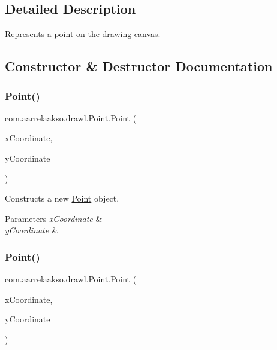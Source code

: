 \subsection{Detailed Description}
Represents a point on the drawing canvas. 

\subsection{Constructor \& Destructor Documentation}
\mbox{\label{classcom_1_1aarrelaakso_1_1drawl_1_1_point_a1eb402d4971df738ea66227c7c12cb70}} 
\subsubsection{\texorpdfstring{Point()}{Point()}\hspace{0.1cm}{\footnotesize\ttfamily [1/3]}}
{\footnotesize\ttfamily com.\+aarrelaakso.\+drawl.\+Point.\+Point (\begin{DoxyParamCaption}\item[{final \hyperlink{interfacecom_1_1aarrelaakso_1_1drawl_1_1_number}{Number}}]{x\+Coordinate,  }\item[{final \hyperlink{interfacecom_1_1aarrelaakso_1_1drawl_1_1_number}{Number}}]{y\+Coordinate }\end{DoxyParamCaption})\hspace{0.3cm}{\ttfamily [protected]}}



Constructs a new \hyperlink{classcom_1_1aarrelaakso_1_1drawl_1_1_point}{Point} object. 


\begin{DoxyParams}{Parameters}
{\em x\+Coordinate} & \\
\hline
{\em y\+Coordinate} & \\
\hline
\end{DoxyParams}
\mbox{\label{classcom_1_1aarrelaakso_1_1drawl_1_1_point_afb3376a5897946911a2230562fff07cf}} 
\subsubsection{\texorpdfstring{Point()}{Point()}\hspace{0.1cm}{\footnotesize\ttfamily [2/3]}}
{\footnotesize\ttfamily com.\+aarrelaakso.\+drawl.\+Point.\+Point (\begin{DoxyParamCaption}\item[{@Not\+Null final Integer}]{x\+Coordinate,  }\item[{@Not\+Null final Integer}]{y\+Coordinate }\end{DoxyParamCaption})\hspace{0.3cm}{\ttfamily [protected]}}

